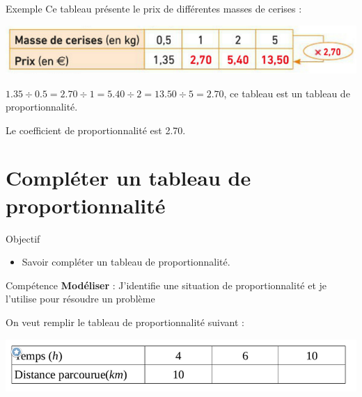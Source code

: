 \documentclass[xcolor={dvipsnames}]{beamer}
\begin{document}
	\begin{frame}
		\begin{exampleblock}{Exemple}
			Ce tableau présente le prix de différentes masses de cerises :
			\begin{center}
				
				\includegraphics[scale=0.5]{tb_prop1}
			\end{center}
		
		$\num{1,35} \div \num{0.5} = \num{2,70} \div 1 = \num{5.40} \div 2 = \num{13,50} \div 5 = \num{2.70} $, ce tableau est un tableau de proportionnalité. \pause
		
		Le coefficient de proportionnalité est \num{2.70}.
		\end{exampleblock}
	\end{frame}

\section{Compléter un tableau de proportionnalité}

	\begin{frame}
	\begin{block}{Objectif}
		\begin{itemize}
			\item Savoir compléter un tableau de proportionnalité.
		\end{itemize}
	\end{block}
	
	\begin{block}{Compétence}
		\textbf{Modéliser} : J'identifie une situation de proportionnalité et je l'utilise pour résoudre un problème 
	\end{block}
\end{frame}

\begin{frame}
	\begin{mymeth}
		On veut remplir le tableau de proportionnalité suivant :
		
		\begin{center}
			\includegraphics[scale=0.5]{tab3_1}
		\end{center}
	\end{mymeth}
		
\end{frame}
\end{document}
